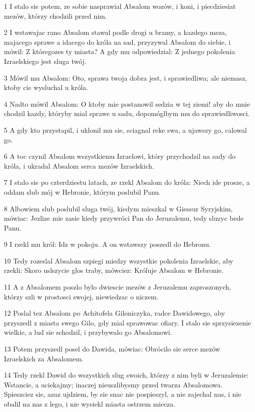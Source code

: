 \par 1 I stalo sie potem, ze sobie nasprawial Absalom wozów, i koni, i piecdziesiat mezów, którzy chodzili przed nim.
\par 2 I wstawajac rano Absalom stawal podle drogi u bramy, a kazdego meza, majacego sprawe a idacego do króla na sad, przyzywal Absalom do siebie, i mówil: Z któregozes ty miasta? A gdy mu odpowiedzial: Z jednego pokolenia Izraelskiego jest sluga twój.
\par 3 Mówil mu Absalom: Oto, sprawa twoja dobra jest, i sprawiedliwa; ale niemasz, ktoby cie wysluchal u króla.
\par 4 Nadto mówil Absalom: O ktoby mie postanowil sedzia w tej ziemi! aby do mnie chodzil kazdy, któryby mial sprawe u sadu, dopomóglbym mu do sprawiedliwosci.
\par 5 A gdy kto przystapil, i uklonil mu sie, sciagnal reke swa, a ujawszy go, calowal go.
\par 6 A toc czynil Absalom wszystkiemu Izraelowi, który przychodzil na sady do króla, i ukradal Absalom serca mezów Izraelskich.
\par 7 I stalo sie po czterdziestu latach, ze rzekl Absalom do króla: Niech ide prosze, a oddam slub mój w Hebronie, którym poslubil Panu.
\par 8 Albowiem slub poslubil sluga twój, kiedym mieszkal w Giessur Syryjskim, mówiac: Jezlize mie zasie kiedy przywróci Pan do Jeruzalemu, tedy sluzyc bede Panu.
\par 9 I rzekl mu król: Idz w pokoju. A on wstawszy poszedl do Hebronu.
\par 10 Tedy rozeslal Absalom szpiegi miedzy wszystkie pokolenia Izraelskie, aby rzekli: Skoro uslszycie glos traby, mówciez: Króluje Absalom w Hebronie.
\par 11 A z Absalomem poszlo bylo dwiescie mezów z Jeruzalemu zaproszonych, którzy szli w prostosci swojej, niewiedzac o niczem.
\par 12 Poslal tez Absalom po Achitofela Giloniczyka, radce Dawidowego, aby przyszedl z miasta swego Gilo, gdy mial sprawowac ofiary. I stalo sie sprzysiezenie wielkie, a lud sie schodzil, i przybywalo go Absalomowi.
\par 13 Potem przyszedl posel do Dawida, mówiac: Obrócilo sie serce mezów Izraelskich za Absalomem.
\par 14 Tedy rzekl Dawid do wszystkich slug swoich, którzy z nim byli w Jeruzalemie: Wstancie, a uciekajmy; inaczej nieuszlibysmy przed twarza Absalomowa. Spieszciez sie, azaz ujdziem, by sie snac nie pospieszyl, a nie zajechal nas, i nie obalil na nas z lego, i nie wysiekl miasta ostrzem miecza.
